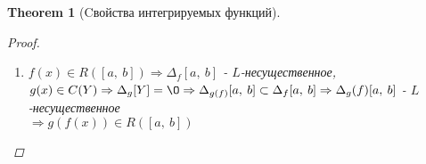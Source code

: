 \documentclass[a4paper,12pt]{bookest}
\newtheorem{theorem}{Theorem}[section]
\theoremstyle{remark}
\begin{document}
\begin{theorem}[Cвойства интегрируемых функций]
\begin{proof}
\begin{enumerate}
\begin{itemize}
					\item [3.] $\Delta_{\frac fg}[a,\>b]\subset(\Delta_f[a,\>b]\cup\Delta_g[a,\>b]\Rightarrow\Delta_{\frac fg}[a,\>b]$ - $L$-несущественное\\ $\Rightarrow\frac{f(x)}{g(x)}\in r([a,\>b])$
				\end{itemize}
			\item $f(x)\in R([a,\>b])\Rightarrow\Delta_f[a,\>b]$ - $L$-несущественное, $g(x)\in C(Y)\\\Rightarrow\Delta_g [Y]=\O\Rightarrow \Delta_{g(f)}[a,\>b]\subset \Delta_f[a,\>b]\Rightarrow\Delta_g(f)[a,\>b]$ - $L$-несущественное \\$\Rightarrow g(f(x))\in R([a,\>b])$
		\end{enumerate}
	\end{proof}
\end{theorem}
\end{document}
